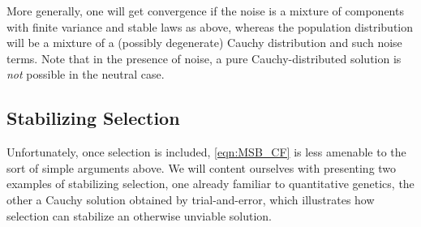 \documentclass{article}
\newcommand{\eg}{\textit{e.g.,}\,}
\newcommand{\1}{\mathbbm{1}}
\theoremstyle{remark}
\theoremstyle{definition}
\begin{document}



More generally, one will get convergence if the noise is a mixture of components with finite variance and stable laws as above, whereas the population distribution will be a mixture of a (possibly degenerate) Cauchy distribution and such noise terms. Note that in the presence of noise, a pure Cauchy-distributed solution is \emph{not} possible in the neutral case.

\subsection{Stabilizing Selection}
    \label{sec:stabilizing_selection}
    
Unfortunately, once selection is included, \eqref{eqn:MSB_CF} is less amenable to the sort of simple arguments above.  We will content ourselves with presenting two examples of stabilizing selection, one already familiar to quantitative genetics, the other a Cauchy solution obtained by trial-and-error, which illustrates how selection can stabilize an otherwise unviable solution.
\end{document}
